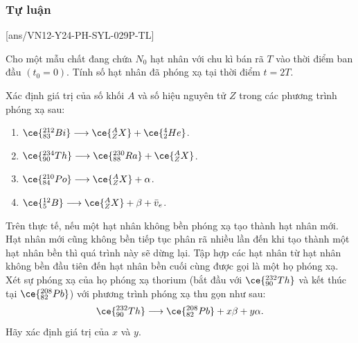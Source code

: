 \subsubsection{Tự luận}
[ans/VN12-Y24-PH-SYL-029P-TL]
\setcounter{ex}{0}
\begin{ex}
	Cho một mẫu chất đang chứa $N_0$ hạt nhân với chu kì bán rã $T$ vào thời điểm ban đầu $\left(t_0=0\right)$. Tính số hạt nhân đã phóng xạ tại thời điểm $t=2 T$.
\end{ex}
\begin{ex}
	Xác định giá trị của số khối $A$ và số hiệu nguyên tử $Z$ trong các phương trình phóng xạ sau:
	\begin{enumerate}[label=\alph*), parsep=0.25cm]
		\item $\ce{_{83}^{212}Bi} \longrightarrow\ce{_Z^{A}X}+\ce{_2^4He}$.
		\item $\ce{_{90}^{234}Th} \longrightarrow\ce{_{88}^{230}Ra}+\ce{^A_ZX}$.
		\item $\ce{_{84}^{210}Po} \longrightarrow \ce{^A_ZX}+\alpha$.
		\item $\ce{_5^{12}B} \longrightarrow\ce{^A_ZX}+\beta+\bar{v}_{e}$.
	\end{enumerate}
\end{ex}
\begin{ex}
	Trên thực tế, nếu một hạt nhân không bền phóng xạ tạo thành hạt nhân mới. Hạt nhân mới cũng không bền tiếp tục phân rã nhiều lần đến khi tạo thành một hạt nhân bền thì quá trình này sẽ dừng lại. Tập hợp các hạt nhân từ hạt nhân không bền đầu tiên đến hạt nhân bền cuối cùng được gọi là một họ phóng xạ. Xét sự phóng xạ của họ phóng xạ thorium (bắt đầu với $\ce{_{90}^{232}Th}$ và kết thúc tại $\ce{_{82}^{208}Pb}$) với phương trình phóng xạ thu gọn như sau:
	$$\ce{_{90}^{232}Th} \longrightarrow\ce{_{82}^{208}Pb}+x \beta+y \alpha.
	$$
	Hãy xác định giá trị của $x$ và $y$.
\end{ex}

